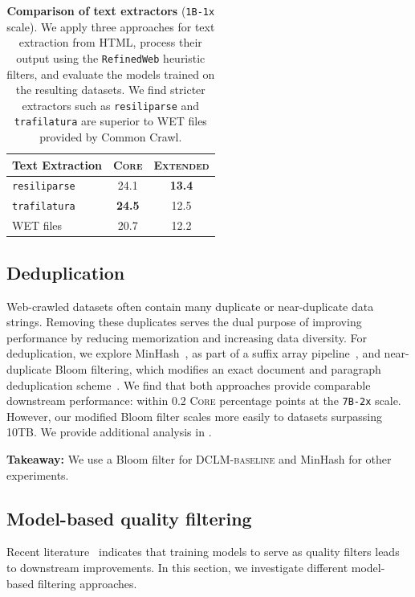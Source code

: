 \documentclass{article}
\newcommand{\takeawaybox}[1]{
  \begin{tcolorbox}[
    colback=blue!10,
    colframe=blue!50,
    boxrule=0.5pt,
    arc=0mm,
    left=5pt,
    right=5pt,
    top=2pt,
    bottom=2pt,
    fontupper={\fontsize{9.5pt}{11.75pt}\selectfont}
  ]
    \textbf{Takeaway:} #1
  \end{tcolorbox}
  \vspace*{-0.1cm}
}
\newcommand{\hqpool}{\textsc{DCLM-baseline}\xspace}
\newcommand{\strack}{\texttt{1B-1x}\xspace}
\newcommand{\xltrack}{\texttt{7B-2x}\xspace}
\newcommand{\rw}{\texttt{RefinedWeb}\xspace}
\newcommand{\trafilatura}{\texttt{trafilatura}\xspace}
\newcommand{\resiliparse}{\texttt{resiliparse}\xspace}
\newcommand{\lowvar}{\textsc{Core}\xspace}
\newcommand{\aggscore}{\textsc{Extended}\xspace}
\newcommand{\commoncrawl}{Common Crawl\xspace}
\begin{document}
\begin{table}[t]
\centering
\caption{\textbf{Comparison of text extractors} (\strack{} scale). We apply three approaches for text extraction from HTML, process their output using the \rw{} heuristic filters, and evaluate the models trained on the resulting datasets. We find stricter extractors such as \resiliparse and \trafilatura are superior to WET files provided by \commoncrawl.}
\label{tab:html_extraction}
\begin{tabular}{lcc}
\toprule
     Text Extraction &       \lowvar &     \aggscore \\
\midrule
\texttt{resiliparse} &          24.1 & \textbf{13.4} \\
\texttt{trafilatura} & \textbf{24.5} &          12.5 \\
           WET files &          20.7 &          12.2 \\\bottomrule
\end{tabular}
\end{table}

\subsection{Deduplication}
\label{sec:dedup}
Web-crawled datasets often contain many duplicate or near-duplicate data strings.
Removing these duplicates serves the dual purpose of improving performance by reducing memorization \citep{carlini2023quantifying, Lee2021DeduplicatingTD} and increasing data diversity.
For deduplication, we explore MinHash~\citep{minhash}, as part of a suffix array pipeline~\citep{Lee2021DeduplicatingTD, refinedweb}, and near-duplicate Bloom filtering, which modifies an exact document and paragraph deduplication scheme~\citep{soldaini2024dolma}.
We find that both approaches provide comparable downstream performance: within 0.2 \lowvar percentage points at the \xltrack scale.
However, our modified Bloom filter scales more easily to datasets surpassing 10TB.
We provide additional analysis in .

\takeawaybox{We use a Bloom filter for \hqpool and MinHash for other experiments.}

\subsection{Model-based quality filtering}
\label{sec:quality_filtering}
Recent literature~\citep{fang2023dfn,soldaini2024dolma, brandfonbrener2024color} indicates that training models to serve as quality filters leads to downstream improvements.
In this section, we investigate different model-based filtering approaches.
\end{document}
